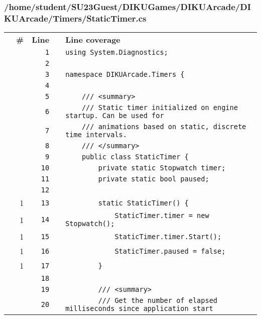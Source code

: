 \documentclass[a4paper,landscape,10pt]{article}
\begin{document}
\subsubsection{/home/student/SU23Guest/DIKUGames/DIKUArcade/DIKUArcade/Timers/StaticTimer.cs}
\begin{longtable}[l]{lrrll}
\textbf{} & \textbf{\#} & \textbf{Line} & \textbf{} & \textbf{Line coverage}\\
\cellcolor{gray} &  & \verb~1~ & & \verb~using System.Diagnostics;~\\
\cellcolor{gray} &  & \verb~2~ & & \verb~~\\
\cellcolor{gray} &  & \verb~3~ & & \verb~namespace DIKUArcade.Timers {~\\
\cellcolor{gray} &  & \verb~4~ & & \verb~~\\
\cellcolor{gray} &  & \verb~5~ & & \verb~    /// <summary>~\\
\cellcolor{gray} &  & \verb~6~ & & \verb~    /// Static timer initialized on engine startup. Can be used for~\\
\cellcolor{gray} &  & \verb~7~ & & \verb~    /// animations based on static, discrete time intervals.~\\
\cellcolor{gray} &  & \verb~8~ & & \verb~    /// </summary>~\\
\cellcolor{gray} &  & \verb~9~ & & \verb~    public class StaticTimer {~\\
\cellcolor{gray} &  & \verb~10~ & & \verb~        private static Stopwatch timer;~\\
\cellcolor{gray} &  & \verb~11~ & & \verb~        private static bool paused;~\\
\cellcolor{gray} &  & \verb~12~ & & \verb~~\\
\cellcolor{green} & 1 & \verb~13~ & & \verb~        static StaticTimer() {~\\
\cellcolor{green} & 1 & \verb~14~ & & \verb~            StaticTimer.timer = new Stopwatch();~\\
\cellcolor{green} & 1 & \verb~15~ & & \verb~            StaticTimer.timer.Start();~\\
\cellcolor{green} & 1 & \verb~16~ & & \verb~            StaticTimer.paused = false;~\\
\cellcolor{green} & 1 & \verb~17~ & & \verb~        }~\\
\cellcolor{gray} &  & \verb~18~ & & \verb~~\\
\cellcolor{gray} &  & \verb~19~ & & \verb~        /// <summary>~\\
\cellcolor{gray} &  & \verb~20~ & & \verb~        /// Get the number of elapsed milliseconds since application start~\\

\end{longtable}
\end{document}
